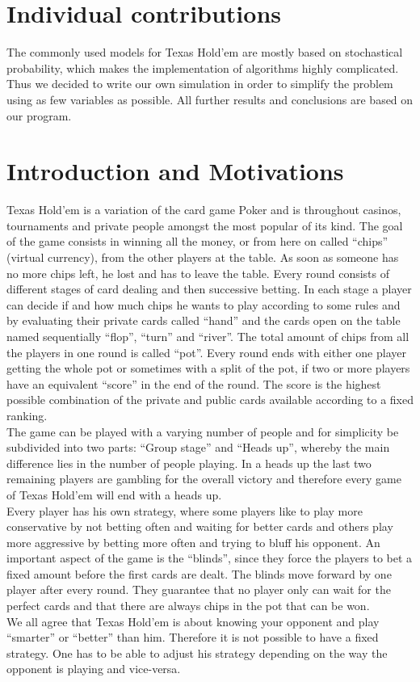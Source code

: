 \documentclass[11pt]{article}
\begin{document}
\section{Individual contributions}

The commonly used models for Texas Hold'em are mostly based on stochastical probability, which makes the implementation of algorithms highly complicated. Thus we decided to write our own simulation in order to simplify the problem using as few variables as possible. All further results and conclusions are based on our program.


\section{Introduction and Motivations}

Texas Hold’em is a variation of the card game Poker and is throughout casinos, tournaments and private people amongst the most popular of its kind. The goal of the game consists in winning all the money, or from here on called “chips” (virtual currency), from the other players at the table. As soon as someone has no more chips left, he lost and has to leave the table.
Every round consists of different stages of card dealing and then successive betting. In each stage a player can decide if and how much chips he wants to play according to some rules and by evaluating their private cards called “hand” and the cards open on the table named sequentially “flop”, “turn” and “river”.
The total amount of chips from all the players in one round is called “pot”. Every round ends with either one player getting the whole pot or sometimes with a split of the pot, if two or more players have an equivalent “score” in the end of the round. The score is the highest possible combination of the private and public cards available according to a fixed ranking.
\\
The game can be played with a varying number of people and for simplicity be subdivided into two parts: “Group stage” and “Heads up”, whereby the main difference lies in the number of people playing. In a heads up the last two remaining players are gambling for the overall victory and therefore every game of Texas Hold’em will end with a heads up.
\\
Every player has his own strategy, where some players like to play more conservative by not betting often and waiting for better cards and others play more aggressive by betting more often and trying to bluff his opponent. An important aspect of the game is the “blinds”, since they force the players to bet a fixed amount before the first cards are dealt. The blinds move forward by one player after every round. They guarantee that no player only can wait for the perfect cards and that there are always chips in the pot that can be won.
\\							
We all agree that Texas Hold’em is about knowing your opponent and play “smarter” or “better” than him. Therefore it is not possible to have a fixed strategy. One has to be able to adjust his strategy depending on the way the opponent is playing and vice-versa.\\
 
\end{document}
